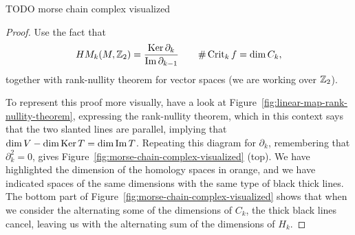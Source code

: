 \begin{marginfigure}
    \centering
    \caption{TODO morse chain complex visualized}
    \label{fig:morse-chain-complex-visualized}
\end{marginfigure}
\begin{proof}
    Use the fact that 
    \[
        \HMf[k]{M, \Z_2} = \frac{\Ker \partial_k}{\Im \partial_{k-1}} \qquad \# \Crit_k f = \dim C_k,
    \]
    together with rank-nullity theorem for vector spaces (we are working over $\Z_2$).

    To represent this proof more visually, have a look at Figure~\ref{fig:linear-map-rank-nullity-theorem}, expressing the rank-nullity theorem, which in this context says that the two slanted lines are parallel, implying that $\dim V - \dim \Ker T = \dim \Im T$.
    Repeating this diagram for $\partial_k$, remembering that  $\partial_k^2 = 0$, gives Figure~\ref{fig:morse-chain-complex-visualized} (top). We have highlighted the dimension of the homology spaces in orange, and we have indicated spaces of the same dimensions with the same type of black thick lines.
    The bottom part of Figure~\ref{fig:morse-chain-complex-visualized} shows that when we consider the alternating some of the dimensions of $C_k$, the thick black lines cancel, leaving us with the alternating sum of the dimensions of $H_k$.
\end{proof}


